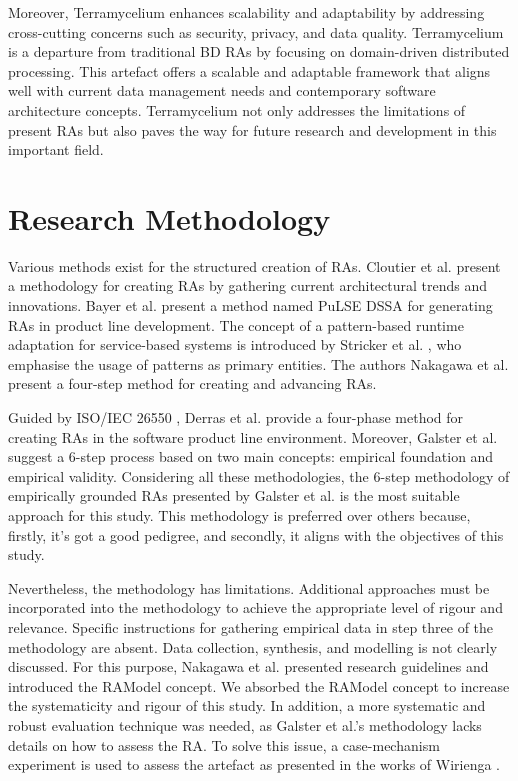 \documentclass[preprint,12pt]{elsarticle}
\begin{document}
Moreover, Terramycelium enhances scalability and adaptability by addressing cross-cutting concerns such as security, privacy, and data quality. Terramycelium is a departure from traditional BD RAs by focusing on domain-driven distributed processing. This artefact offers a scalable and adaptable framework that aligns well with current data management needs and contemporary software architecture concepts. Terramycelium not only addresses the limitations of present RAs but also paves the way for future research and development in this important field.

\section{Research Methodology}

Various methods exist for the structured creation of RAs. Cloutier et al. \cite{Cloutier2010} present a methodology for creating RAs by gathering current architectural trends and innovations. Bayer et al. \cite{bayer1999pulse} present a method named PuLSE DSSA for generating RAs in product line development. The concept of a pattern-based runtime adaptation for service-based systems is introduced by Stricker et al. \cite{stricker2010creating}, who emphasise the usage of patterns as primary entities. The authors Nakagawa et al. \cite{nakagawa2009towards} present a four-step method for creating and advancing RAs. 

Guided by ISO/IEC 26550 \cite{wg2015iso}, Derras et al. \cite{Derras} provide a four-phase method for creating RAs in the software product line environment. Moreover, Galster et al. \cite{GALSTER2011Empirically} suggest a 6-step process based on two main concepts: empirical foundation and empirical validity. Considering all these methodologies, the 6-step methodology of empirically grounded RAs presented by Galster et al. \cite{GALSTER2011Empirically} is the most suitable approach for this study. This methodology is preferred over others because, firstly, it's got a good pedigree, and secondly, it aligns with the objectives of this study.

Nevertheless, the methodology has limitations. Additional approaches must be incorporated into the methodology to achieve the appropriate level of rigour and relevance. Specific instructions for gathering empirical data in step three of the methodology are absent. Data collection, synthesis, and modelling is not clearly discussed. For this purpose, Nakagawa et al. \cite{Nakagawa} presented research guidelines and introduced the RAModel concept. We absorbed the RAModel concept to increase the systematicity and rigour of this study. In addition, a more systematic and robust evaluation technique was needed, as Galster et al.'s methodology lacks details on how to assess the RA. To solve this issue, a case-mechanism experiment is used to assess the artefact as presented in the works of Wirienga \cite{wieringa2014design}.
\end{document}
